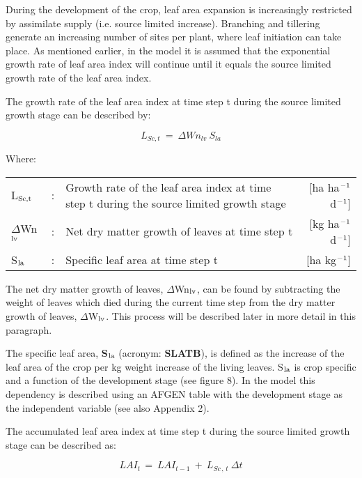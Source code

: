 During the development of the crop, leaf area expansion is increasingly restricted by
assimilate supply (i.e. source limited increase). Branching and tillering generate an
increasing number of sites per plant, where leaf initiation can take place. As mentioned
earlier, in the model it is assumed that the exponential growth rate of leaf area index will
continue until it equals the source limited growth rate of the leaf area index.

The growth rate of the leaf area index at time step t during the source limited growth 
stage can be described by:

\begin{equation}
\label{eq:5.52}
L _{Sc,t} ~=~\Delta Wn _{lv} ~S _{la} 
\end{equation}

Where:\\[5pt]
\begin{tabularx}{\textwidth}{llXr}
	L$_{{\rm Sc,t}}$ &:& Growth rate of the leaf area index at time step t
	during the source limited growth stage    &
	[ha ha$^{{\rm -1}}$ d$^{{\rm -1}}$]\\
	$\Delta$Wn$_{{\rm lv}}$ &:& Net dry matter growth of leaves at time step t    &
	[kg ha$^{{\rm -1}}$ d$^{{\rm -1}}$]\\
	S$_{{\rm la}}$ &:& Specific leaf area at time step t   &
	[ha kg$^{{\rm -1}}$]\\
\end{tabularx}

The net dry matter growth of leaves, $\Delta$Wn$_{{\rm lv}}$, can be found by subtracting the weight of
leaves which died during the current time step from the dry matter growth of leaves,
$\Delta$W$_{{\rm lv}}$. This process will be described later in more detail in this paragraph.

The specific leaf area, {\bf S$_{{\rm la}}$} (acronym: {\bf SLATB}), is defined as the increase of the leaf area
of the crop per kg weight increase of the living leaves. S$_{{\rm la}}$ is crop specific and a function
of the development stage (see figure 8). In the model this dependency is described using
an AFGEN table with the development stage as the independent variable (see also
Appendix 2).

The accumulated leaf area index at time step t during the source limited growth stage can
be described as:

\begin{equation}
\label{eq:5.53}
LAI _{t~} =~LAI _{t-1} ~+~L _{Sc\, ,\, t} ~\Delta t
\end{equation}

